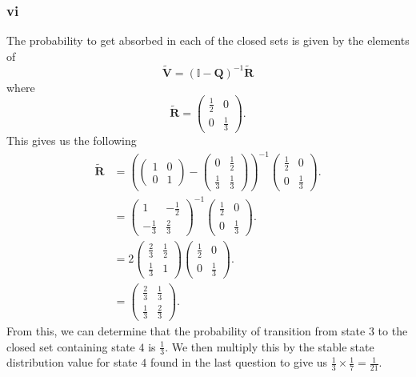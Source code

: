 \documentclass{article}
\begin{document}
\subsubsection{vi}
The probability to get absorbed in each of the closed sets is given by the elements of 
\begin{equation}
    \mathbf{\tilde{V}} = (\mathbb{I}-\mathbf{Q})^{-1}\mathbf{\tilde{R}}
\end{equation}
where 
\begin{equation}
    \mathbf{\tilde{R}} = \begin{pmatrix}
        \frac{1}{2} & 0 \\ 0 & \frac{1}{3}
    \end{pmatrix}.
\end{equation}
This gives us the following
\begin{align}
    \mathbf{\tilde{R}} &= \left( \begin{pmatrix}
        1 & 0 \\ 0 & 1
    \end{pmatrix}-\begin{pmatrix}
        0 & \frac{1}{2} \\ \frac{1}{3} & \frac{1}{3}
    \end{pmatrix} \right)^{-1}\begin{pmatrix}
        \frac{1}{2} & 0 \\ 0 & \frac{1}{3}
    \end{pmatrix}.\\
    &=  \begin{pmatrix}
        1 & -\frac{1}{2} \\ -\frac{1}{3} & \frac{2}{3}
    \end{pmatrix}^{-1}\begin{pmatrix}
        \frac{1}{2} & 0 \\ 0 & \frac{1}{3}
    \end{pmatrix}.\\
    &= 2\begin{pmatrix}
        \frac{2}{3} & \frac{1}{2} \\ \frac{1}{3} & 1
    \end{pmatrix}\begin{pmatrix}
        \frac{1}{2} & 0 \\ 0 & \frac{1}{3}
    \end{pmatrix}.\\
    &= \begin{pmatrix}
        \frac{2}{3} & \frac{1}{3} \\ \frac{1}{3} & \frac{2}{3}
    \end{pmatrix}.
\end{align}
From this, we can determine that the probability of transition from state $3$ to the closed set containing state $4$ is $\frac{1}{3}$. We then multiply this by the stable state distribution value for state $4$ found in the last question to give us $\frac{1}{3}\times\frac{1}{7}=\frac{1}{21}$.
\end{document}
